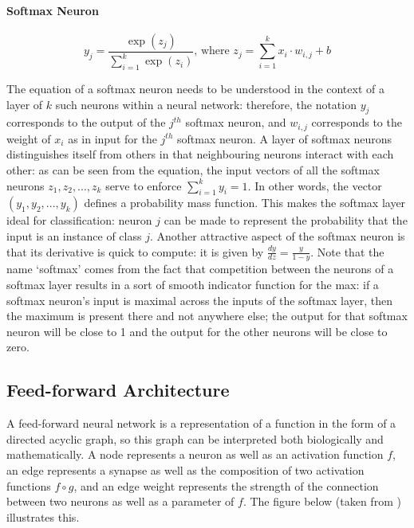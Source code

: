 \documentclass[a4paper,11pt]{article}
\begin{document}
\paragraph{Softmax Neuron}
\begin{equation}
\label{}
y_{j} = \frac{\exp(z_{j})}{\sum\limits_{i=1}^k\exp(z_{i})} \text{, where } z_{j} = \sum\limits_{i=1}^k x_{i}\cdot w_{i,j} + b
\end{equation}

The equation of a softmax neuron needs to be understood in the context of a layer of $k$ such neurons within a neural network: therefore, the notation $y_{j}$ corresponds to the output of the $j^{th}$ softmax neuron, and $w_{i,j}$ corresponds to the weight of $x_{i}$ as in input for the $j^{th}$ softmax neuron. A layer of softmax neurons distinguishes itself from others in that neighbouring neurons interact with each other: as can be seen from the equation, the input vectors of all the softmax neurons $z_{1}, z_{2}, ..., z_{k}$ serve to enforce $\sum\limits_{i=1}^k y_{i} = 1$. In other words, the vector $(y_{1}, y_{2}, ..., y_{k})$ defines a probability mass function. This makes the softmax layer ideal for classification: neuron $j$ can be made to represent the probability that the input is an instance of class $j$. Another attractive aspect of the softmax neuron is that its derivative is quick to compute: it is given by $\frac{dy}{dz} = \frac{y}{1-y}$. Note that the name `softmax' comes from the fact that competition between the neurons of a softmax layer results in a sort of smooth indicator function for the max: if a softmax neuron's input is maximal across the inputs of the softmax layer, then the maximum is present there and not anywhere else; the output for that softmax neuron will be close to 1 and the output for the other neurons will be close to zero.\\


\subsection{Feed-forward Architecture}

A feed-forward neural network is a representation of a function in the form of a directed acyclic graph, so this graph can be interpreted both biologically and mathematically. A node represents a neuron as well as an activation function $f$, an edge represents a synapse as well as the composition of two activation functions $f \circ g$, and an edge weight represents the strength of the connection between two neurons as well as a parameter of $f$. The figure below (taken from \cite{DL-book}) illustrates this.
\end{document}
